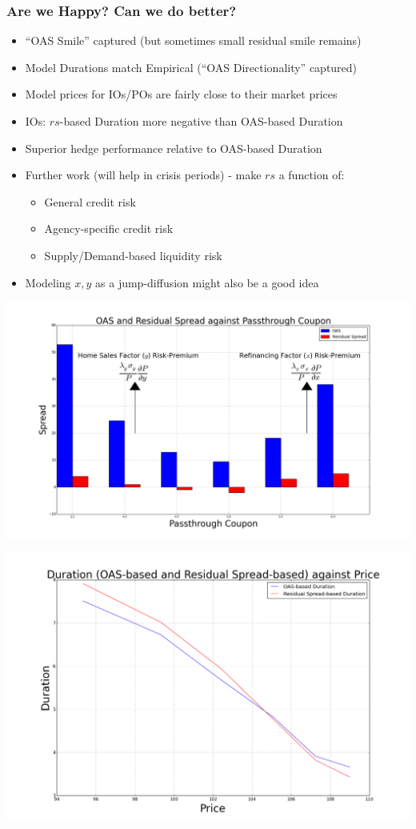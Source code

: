 \documentclass{beamer}
\begin{document}
\begin{frame}
\frametitle{Are we Happy? Can we do better?}
\begin{itemize}
\item ``OAS Smile'' captured (but sometimes small residual smile remains)
\item Model Durations match Empirical (``OAS Directionality'' captured)
\item Model prices for IOs/POs are fairly close to their market prices
\item IOs: $rs$-based Duration more negative than OAS-based Duration 
\item Superior hedge performance relative to OAS-based Duration
\item Further work (will help in crisis periods) - make $rs$ a function of:
\begin{itemize}
\item General credit risk
\item Agency-specific credit risk
\item Supply/Demand-based liquidity risk
\end{itemize}
\item Modeling $x,y$ as a jump-diffusion might also be a good idea 
\end{itemize}
\end{frame}

\begin{frame}
\includegraphics[scale=0.27]{oas_smile_rs_smile.png}
\end{frame}

\begin{frame}
\includegraphics[scale=0.32]{oas_dur_rs_dur.png}
\end{frame}
\end{document}
